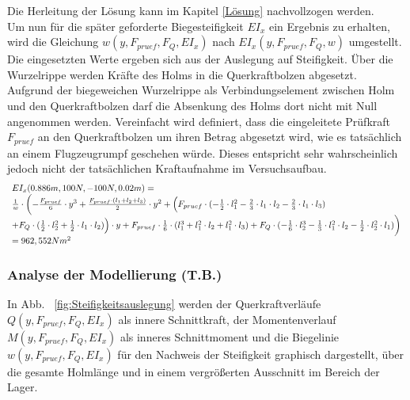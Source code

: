 Die Herleitung der Lösung kann im Kapitel \ref{Lösung} nachvollzogen werden.\\

\noindent Um nun für die später geforderte Biegesteifigkeit $EI_{x}$ ein Ergebnis zu erhalten, wird die Gleichung $w(y,F_{pruef},F_{Q}, EI_{x})$ nach $EI_{x}(y,F_{pruef},F_{Q},w)$ umgestellt. Die eingesetzten Werte ergeben sich aus der Auslegung auf Steifigkeit. Über die Wurzelrippe werden Kräfte des Holms in die Querkraftbolzen abgesetzt. Aufgrund der biegeweichen Wurzelrippe als Verbindungselement zwischen Holm und den Querkraftbolzen darf die Absenkung des Holms dort nicht mit Null angenommen werden. Vereinfacht wird definiert, dass die eingeleitete Prüfkraft $F_{pruef}$ an den Querkraftbolzen um ihren Betrag abgesetzt wird, wie es tatsächlich an einem Flugzeugrumpf geschehen würde. Dieses entspricht sehr wahrscheinlich jedoch nicht der tatsächlichen Kraftaufnahme im Versuchsaufbau.
\begin{equation}
	\begin{array}{l}
		EI_{x}(0.886m, 100N, -100N, 0.02m)= \\
		\frac{1}{w}\cdot\biggl(-\frac{F_{pruef}}{6}\cdot y^{3} + \frac{ F_{pruef}\cdot (l_{1}+l_{2}+l_{3})}{2}\cdot y^{2} + \Bigl(F_{pruef}\cdot(-\frac{1}{2}\cdot l_{1}^{2} -\frac{2}{3}\cdot l_{1}\cdot l_{2}-\frac{2}{3}\cdot l_{1}\cdot l_{3}) \\ +F_{Q}\cdot(\frac{1}{2}\cdot l_{2}^{2}+\frac{1}{2}\cdot l_{1}\cdot l_{2})\Bigr)\cdot y + F_{pruef}\cdot\frac{1}{6}\cdot(l_{1}^{3}+l_{1}^{2}\cdot l_{2}+l_{1}^{2}\cdot l_{3}) + F_{Q}\cdot(-\frac{1}{6}\cdot l_{2}^{3}-\frac{1}{3}\cdot l_{1}^{2}\cdot l_{2}-\frac{1}{2}\cdot l_{2}^{2}\cdot l_{1})\biggr)\\
		=962,552Nm^{2}
	\end{array}
\end{equation}

\subsubsection{Analyse der Modellierung (T.B.)}
In Abb. ~\ref{fig:Steifigkeitsauslegung} werden der Querkraftverläufe $Q(y,F_{pruef},F_{Q},EI_{x})$ als innere Schnittkraft, der Momentenverlauf $M(y,F_{pruef},F_{Q},EI_{x})$ als inneres Schnittmoment und die Biegelinie $w(y,F_{pruef},F_{Q},EI_{x})$ für den Nachweis der Steifigkeit graphisch dargestellt, über die gesamte Holmlänge und in einem vergrößerten Ausschnitt im Bereich der Lager. \\

